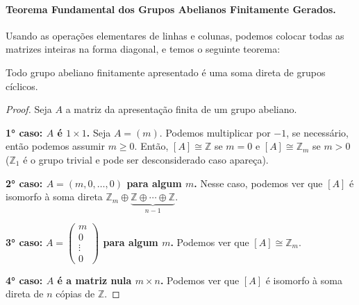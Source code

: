     	\paragraph{Teorema Fundamental dos Grupos Abelianos Finitamente Gerados.} Usando as operações 
    	elementares de linhas e colunas, podemos colocar todas as matrizes inteiras na forma diagonal, 
    	e temos o seguinte teorema:
    	\begin{theorem}
    	\label{teorema fundamental abelianos finitamente apresentados}
    		Todo grupo abeliano finitamente apresentado é uma soma direta de grupos cíclicos.
    	\end{theorem}
    	\begin{proof}
    		Seja $A$ a matriz da apresentação finita de um grupo abeliano.
    		
    		\par\textbf{1° caso: $A$ é $1\times1$.} Seja $A = (m)$. Podemos multiplicar por $-1$, se necessário,
    		então podemos assumir $m\geq0$. Então, $[A]\cong\mathbb{Z}$ se $m=0$ e $[A]\cong\mathbb{Z}_m$ se 
    		$m>0$ ($\mathbb{Z}_1$ é o grupo trivial e pode ser desconsiderado caso apareça).
    		
    		\par\textbf{2° caso: $A = (m,0,\dots,0)$ para algum $m$.} Nesse caso, podemos ver que $[A]$ é 
    		isomorfo à soma direta $\mathbb{Z}_m\oplus\underbrace{\mathbb{Z}\oplus\cdots\oplus\mathbb{Z}}_{n-1}$.
    		
    		\par\textbf{3° caso:} \textbf{$A = \begin{pmatrix}m\\0\\\vdots\\0\end{pmatrix}$ para algum $m$.} 
    		Podemos ver que $[A]\cong\mathbb{Z}_m$.
    		
    		\par\textbf{4° caso: $A$ é a matriz nula $m\times n$.} Podemos ver que $[A]$ é isomorfo à soma 
    		direta de $n$ cópias de $\mathbb{Z}$.
    		

\end{proof}
